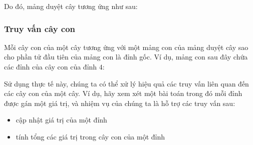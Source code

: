 Do đó, mảng duyệt cây tương ứng như sau:
\begin{center}
\end{center}

\subsubsection{Truy vấn cây con}

Mỗi cây con của một cây tương ứng với một mảng con
của mảng duyệt cây sao cho
phần tử đầu tiên của mảng con là đỉnh gốc.
Ví dụ, mảng con sau đây chứa các
đỉnh của cây con của đỉnh $4$:
\begin{center}
\end{center}
Sử dụng thực tế này, chúng ta có thể xử lý hiệu quả các truy vấn
liên quan đến các cây con của một cây.
Ví dụ, hãy xem xét một bài toán trong đó mỗi đỉnh
được gán một giá trị, và nhiệm vụ của chúng ta là hỗ trợ
các truy vấn sau:
\begin{itemize}
\item cập nhật giá trị của một đỉnh
\item tính tổng các giá trị trong cây con của một đỉnh
\end{itemize}

